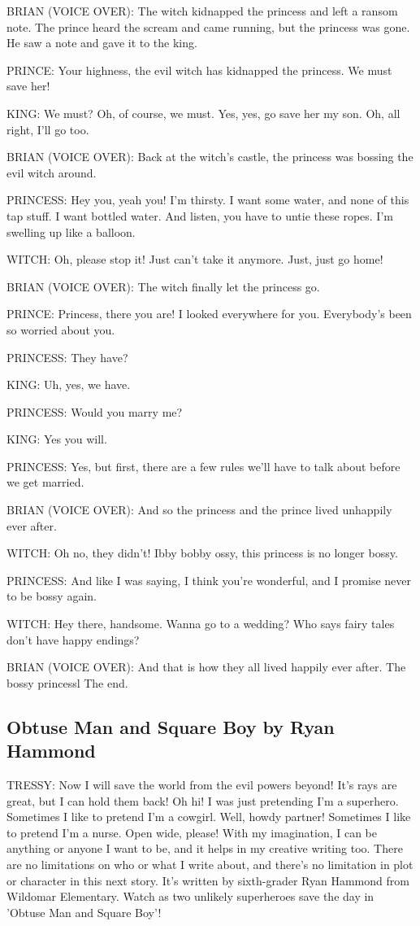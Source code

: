 BRIAN (VOICE OVER):
The witch kidnapped the princess and left a ransom note.
The prince heard the scream and came running, but the princess was gone.
He saw a note and gave it to the king.

PRINCE:
Your highness, the evil witch has kidnapped the princess.
We must save her!

KING:
We must?
Oh, of course, we must.
Yes, yes, go save her my son.
Oh, all right, I'll go too.

BRIAN (VOICE OVER):
Back at the witch's castle, the princess was bossing the evil witch around.

PRINCESS:
Hey you, yeah you!
I'm thirsty.
I want some water, and none of this tap stuff.
I want bottled water.
And listen, you have to untie these ropes.
I'm swelling up like a balloon.

WITCH:
Oh, please stop it!
Just can't take it anymore.
Just, just go home!

BRIAN (VOICE OVER):
The witch finally let the princess go.

PRINCE:
Princess, there you are!
I looked everywhere for you.
Everybody's been so worried about you.

PRINCESS:
They have?

KING:
Uh, yes, we have.

PRINCESS:
Would you marry me?

KING:
Yes you will.

PRINCESS:
Yes, but first, there are a few rules we'll have to talk about before we get married.

BRIAN (VOICE OVER):
And so the princess and the prince lived unhappily ever after.

WITCH:
Oh no, they didn't!
Ibby bobby ossy, this princess is no longer bossy.

PRINCESS:
And like I was saying, I think you're wonderful, and I promise never to be bossy again.

WITCH:
Hey there, handsome.
Wanna go to a wedding?
Who says fairy tales don't have happy endings?

BRIAN (VOICE OVER):
And that is how they all lived happily ever after.
The bossy princessl
The end.

\subsection{Obtuse Man and Square Boy by Ryan Hammond}

TRESSY:
Now I will save the world from the evil powers beyond!
It's rays are great, but I can hold them back!
Oh hi!
I was just pretending I'm a superhero.
Sometimes I like to pretend I'm a cowgirl.
Well, howdy partner!
Sometimes I like to pretend I'm a nurse.
Open wide, please!
With my imagination, I can be anything or anyone I want to be, and it helps in my creative writing too.
There are no limitations on who or what I write about, and there's no limitation in plot or character in this next story.
It's written by sixth-grader Ryan Hammond from Wildomar Elementary.
Watch as two unlikely superheroes save the day in 'Obtuse Man and Square Boy'!

